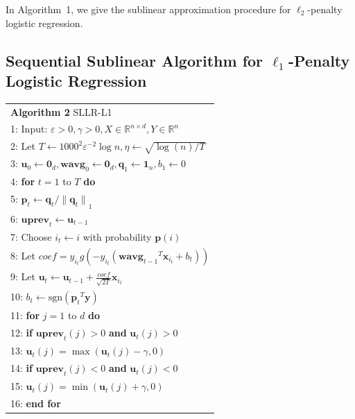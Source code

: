 \documentclass{llncs}
\newcommand{\bwavg}{\mathbf{wavg}}
\newcommand{\bu}{\mathbf{u}}
\newcommand{\buprev}{\mathbf{uprev}}
\newcommand{\bp}{\mathbf{p}}
\newcommand{\bq}{\mathbf{q}}
\newcommand{\lc}{\left(}
\newcommand{\rc}{\right)}
\newcommand{\lj}{\lc j\rc}
\newcommand{\tspace}{\hspace*{2em}}
\newcommand{\tspaces}{\hspace*{1.5em}}
\def\sgn{\mathrm{sgn}}
\begin{document}
    In Algorithm~1, we give the sublinear approximation procedure for $\ell_2$-penalty logistic regression.	

\subsection{Sequential Sublinear Algorithm for $\ell_1$-Penalty Logistic Regression}
	
    \begin{table}[ht]
	\begin{tabular}{l}
	\hline\noalign{\smallskip}
	\textbf{Algorithm 2} SLLR-L1 \\
	\noalign{\smallskip}
	\hline
	\noalign{\smallskip}
		1:    Input: $\varepsilon>0, \gamma>0, X\in\mathbb{R}^{n\times d}, Y\in\mathbb{R}^{n}$ \\
		2:    Let $T\leftarrow{1000}^{2}{\varepsilon}^{-2}\log n, \eta\leftarrow\sqrt{\log\lc n\rc/T}$ \\
		3:    \tspace ${\mathbf{u}}_{0}\leftarrow{\mathbf{0}}_{d},{\bwavg}_{0}\leftarrow{\mathbf{0}}_{d},{\mathbf{\bq}}_{1}\leftarrow{\mathbf{1}}_{n},{b}_{1}\leftarrow 0$\\
		4:    \textbf{for} $t=1$ to $T$ \textbf{do} \\
		5:    \tspace ${\bp}_{t}\leftarrow{\bq}_{t}/{\|{\bq}_{t}\|}_{1}$ \\
		6:	  \tspace $\buprev_t\leftarrow\bu_{t-1}$ \\
		7:    \tspace Choose ${i}_{t}\leftarrow i$ with probability $\bp(i)$ \\
		8:    \tspace Let $coef={y}_{{i}_{t}}g\lc-{y}_{{i}_{t}}\lc {{\bwavg}_{t-1}}^{T}{\mathbf{x}}_{i_t}+{b}_{t} \rc\rc$ \\
		9:    \tspace Let ${\bu}_{t}\leftarrow {\bu}_{t-1}+\frac{coef}{\sqrt{2T}}{\mathbf{x}}_{{i}_{t}}$ \\
		10:   \tspaces\tspace ${b}_{t}\leftarrow \sgn\lc {{\bp}_{t}}^{T}\mathbf{y}\rc$ \\
		11:   \tspaces \textbf{for} $j=1$ to $d$ \textbf{do} \\
		12:   \tspaces\tspace \textbf{if} $\buprev_t\lj>0$ \textbf{and} $\bu_t\lj>0$ \\
		13:	  \tspaces\tspace\tspace $\bu_t\lj=\max \lc \bu_t\lj-\gamma ,0 \rc$ \\
		14:	  \tspaces\tspace \textbf{if} $\buprev_t\lj<0$ \textbf{and} $\bu_t\lj<0$ \\
		15:   \tspaces\tspace\tspace $\bu_t\lj=\min \lc \bu_t\lj+\gamma ,0 \rc$ \\
		16:   \tspaces \textbf{end for} \\

\end{tabular}
\end{table}
\end{document}
